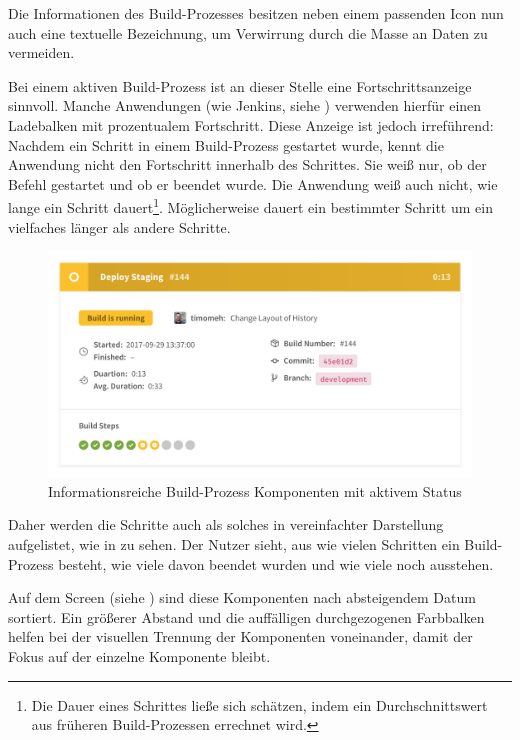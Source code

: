 Die Informationen des Build-Prozesses besitzen neben einem passenden Icon nun auch eine textuelle Bezeichnung, um Verwirrung durch die Masse an Daten zu vermeiden.

Bei einem aktiven Build-Prozess ist an dieser Stelle eine Fortschrittsanzeige sinnvoll. Manche Anwendungen (wie Jenkins, siehe ) verwenden hierfür einen Ladebalken mit prozentualem Fortschritt. Diese Anzeige ist jedoch irreführend: Nachdem ein Schritt in einem Build-Prozess gestartet wurde, kennt die Anwendung nicht den Fortschritt innerhalb des Schrittes. Sie weiß nur, ob der Befehl gestartet und ob er beendet wurde. Die Anwendung weiß auch nicht, wie lange ein Schritt dauert\footnote{Die Dauer eines Schrittes ließe sich schätzen, indem ein Durchschnittswert aus früheren Build-Prozessen errechnet wird.}. Möglicherweise dauert ein bestimmter Schritt um ein vielfaches länger als andere Schritte.

\begin{figure}[h]
  \caption{Informationsreiche Build-Prozess Komponenten mit aktivem Status}
  \label{fig:build-process-detail-active}
  \centering
    \includegraphics[width=\textwidth]{assets/build-detail-active}
\end{figure}

Daher werden die Schritte auch als solches in vereinfachter Darstellung aufgelistet, wie in  zu sehen. Der Nutzer sieht, aus wie vielen Schritten ein Build-Prozess besteht, wie viele davon beendet wurden und wie viele noch ausstehen.

Auf dem Screen (siehe ) sind diese Komponenten nach absteigendem Datum sortiert. Ein größerer Abstand und die auffälligen durchgezogenen Farbbalken helfen bei der visuellen Trennung der Komponenten voneinander, damit der Fokus auf der einzelne Komponente bleibt.

